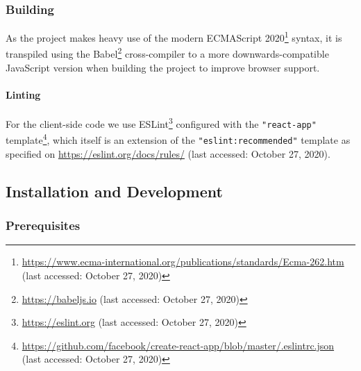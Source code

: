 \subsubsection{Building}
As the project makes heavy use of the modern ECMAScript 2020\footnote{\url{https://www.ecma-international.org/publications/standards/Ecma-262.htm} (last accessed: October 27, 2020)} syntax, it is transpiled using the Babel\footnote{\url{https://babeljs.io} (last accessed: October 27, 2020)} cross-compiler to a more downwards-compatible JavaScript version when building the project to improve browser support.

\paragraph{Linting}
For the client-side code we use ESLint\footnote{\url{https://eslint.org} (last accessed: October 27, 2020)} configured with the \texttt{"react-app"} template\footnote{\url{https://github.com/facebook/create-react-app/blob/master/.eslintrc.json} (last accessed: October 27, 2020)}, which itself is an extension of the \texttt{"eslint:recommended"} template as specified on \url{https://eslint.org/docs/rules/} (last accessed: October 27, 2020).

\subsection{Installation and Development}

\subsubsection{Prerequisites}
\label{subsub:implementation-prerequisites}

